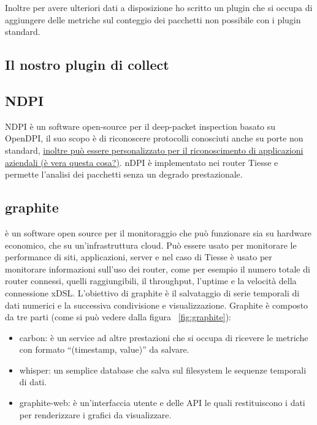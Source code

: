 Inoltre per avere ulteriori dati a disposizione ho scritto un plugin che si occupa di aggiungere delle metriche sul conteggio dei pacchetti non possibile con i plugin standard.

\subsection{Il nostro plugin di collect}

\subsection{NDPI} 
NDPI è un software open-source per il deep-packet inspection basato su OpenDPI, il suo scopo è di riconoscere protocolli conosciuti anche su porte non standard, \uline{inoltre può essere personalizzato per il riconoscimento di applicazioni aziendali (è vera questa cosa?)}. nDPI è implementato nei router Tiesse e permette l'analisi dei pacchetti senza un degrado prestazionale.


\subsection{graphite} è un software open source per il monitoraggio che può funzionare sia su hardware economico, che su un'infrastruttura cloud. Può essere usato per monitorare le performance di siti, applicazioni, server e nel caso di Tiesse è usato per monitorare informazioni sull'uso dei router, come per esempio il numero totale di router connessi, quelli raggiungibili, il throughput, l'uptime e la velocità della connessione xDSL.
L'obiettivo di graphite è il salvataggio di serie temporali di dati numerici e la successiva condivisione e visualizzazione.
Graphite è composto da tre parti (come si può vedere dalla figura ~\ref{fig:graphite}):

\begin{itemize}
    \item carbon: è un service ad altre prestazioni che si occupa di ricevere le metriche con formato ``(timestamp, value)'' da salvare.
    \item whisper: un semplice database che salva sul filesystem le sequenze temporali di dati.
    \item graphite-web: è un'interfaccia utente e delle API le quali restituiscono i dati per renderizzare i grafici da visualizzare.
\end{itemize}

